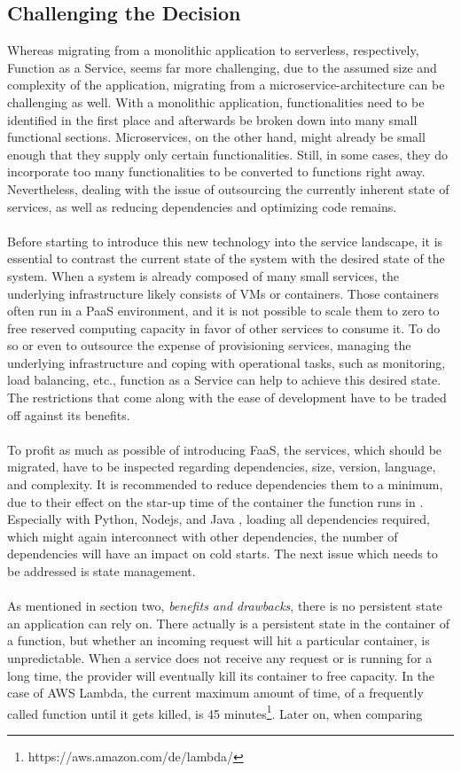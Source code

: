 \documentclass[11pt]{article}
\begin{document}
\subsection{Challenging the Decision}
Whereas migrating from a monolithic application to serverless, respectively, Function as a Service, seems far more challenging, due to the assumed size and complexity of the application, migrating from a microservice-architecture can be challenging as well. With a monolithic application, functionalities need to be identified in the first place and afterwards be broken down into many small functional sections. Microservices, on the other hand, might already be small enough that they supply only certain functionalities. Still, in some cases, they do incorporate too many functionalities to be converted to functions right away. Nevertheless, dealing with the issue of outsourcing the currently inherent state of services, as well as reducing dependencies and optimizing code remains.\\\\ Before starting to introduce this new technology into the service landscape, it is essential to contrast the current state of the system with the desired state of the system. When a system is already composed of many small services, the underlying infrastructure likely consists of VMs or containers. Those containers often run in a PaaS environment, and it is not possible to scale them to zero to free reserved computing capacity in favor of other services to consume it. To do so or even to outsource the expense of provisioning services, managing the underlying infrastructure and coping with operational tasks, such as monitoring, load balancing, etc., function as a Service can help to achieve this desired state. The restrictions that come along with the ease of development have to be traded off against its benefits.\\\\ To profit as much as possible of introducing FaaS, the services, which should be migrated, have to be inspected regarding dependencies, size, version, language, and complexity. It is recommended to reduce dependencies them to a minimum, due to their effect on the star-up time of the container the function runs in \cite{manner2018cold}. Especially with Python, Nodejs, and Java \cite{puripunpinyo2017effect}, loading all dependencies required, which might again interconnect with other dependencies, the number of dependencies will have an impact on cold starts. The next issue which needs to be addressed is state management.\\\\ As mentioned in section two, \textit{benefits and drawbacks}, there is no persistent state an application can rely on. There actually is a persistent state in the container of a function, but whether an incoming request will hit a particular container, is unpredictable. When a service does not receive any request or is running for a long time, the provider will eventually kill its container to free capacity. In the case of AWS Lambda, the current maximum amount of time, of a frequently called function until it gets killed, is 45 minutes\footnote{https://aws.amazon.com/de/lambda/}. Later on, when comparing 
\end{document}
